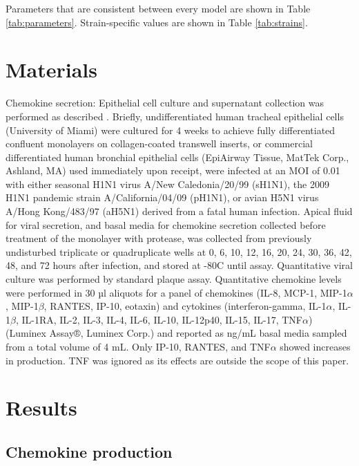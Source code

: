 \documentclass[10pt]{article}
\begin{document}
Parameters that are consistent between every model are shown in Table \ref{tab:parameters}.  Strain-specific values are shown in Table \ref{tab:strains}.

\section*{Materials}

Chemokine secretion:  Epithelial cell culture and supernatant collection was performed as described \cite{Mitchell2011}.  Briefly, undifferentiated human tracheal epithelial cells (University of Miami) were cultured for 4 weeks to achieve fully differentiated confluent monolayers on collagen-coated transwell inserts, or commercial differentiated human bronchial epithelial cells (EpiAirway Tissue, MatTek Corp., Ashland, MA) used immediately upon receipt, were infected at an MOI of 0.01 with either seasonal H1N1 virus A/New Caledonia/20/99 (sH1N1), the 2009 H1N1 pandemic strain A/California/04/09 (pH1N1), or avian H5N1 virus A/Hong Kong/483/97 (aH5N1) derived from a fatal human infection.  Apical fluid for viral secretion, and basal media for chemokine secretion collected before treatment of the monolayer with protease, was collected from previously undisturbed triplicate or quadruplicate wells at 0, 6, 10, 12, 16, 20, 24, 30, 36, 42, 48, and 72 hours after infection, and stored at -80C until assay.  Quantitative viral culture was performed by standard plaque assay.  Quantitative chemokine levels were performed in 30 µl aliquots for a panel of chemokines (IL-8, MCP-1, MIP-1$\alpha$, MIP-1$\beta$, RANTES, IP-10, eotaxin) and cytokines (interferon-gamma, IL-1$\alpha$, IL-1$\beta$, IL-1RA, IL-2, IL-3, IL-4, IL-6, IL-10, IL-12p40, IL-15, IL-17, TNF$\alpha$) (Luminex Assay®, Luminex Corp.) and reported as ng/mL basal media sampled from a total volume of 4 mL.  Only IP-10, RANTES, and TNF$\alpha$ showed increases in production.  TNF was ignored as its effects are outside the scope of this paper.


\section*{Results}

\subsection*{Chemokine production}
\end{document}
